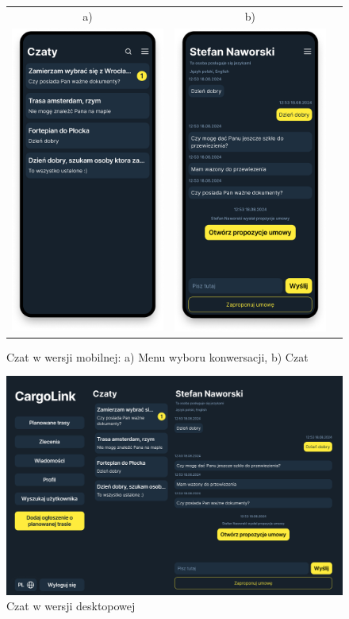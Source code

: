 \begin{figure}[H]
	\centering
	\begin{tabular}{@{}ccc@{}}
            a) & b)\\
    \includegraphics[width=0.3\linewidth]{rozdzial1/czat_1_m.png} &
    \includegraphics[width=0.3\linewidth]{rozdzial1/czat_2_m.png}
    \end{tabular}
    \caption{Czat w wersji mobilnej: a) Menu wyboru konwersacji, b) Czat}
	\label{Rys. fig:Czat - mobile}
\end{figure}
\begin{figure}[H]
	\centering
		\includegraphics[width=0.7\linewidth]{rozdzial1/czat_d.jpg}
	\caption{Czat w wersji desktopowej}
	\label{Rys. fig:Czat - desktop}
\end{figure}

